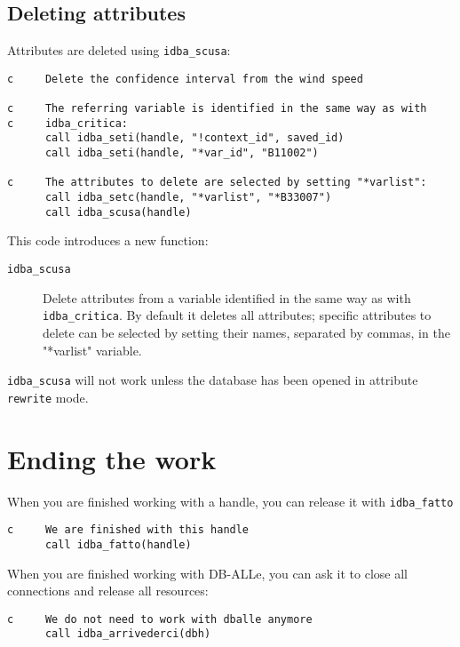 \documentclass[final,12pt,a4paper,twoside]{book}
\begin{document}
\subsection{Deleting attributes}

Attributes are deleted using {\tt idba\_scusa}:

\label{fun-idba_scusa}

\begin{verbatim}
c     Delete the confidence interval from the wind speed

c     The referring variable is identified in the same way as with
c     idba_critica:
      call idba_seti(handle, "!context_id", saved_id)
      call idba_seti(handle, "*var_id", "B11002")

c     The attributes to delete are selected by setting "*varlist":
      call idba_setc(handle, "*varlist", "*B33007")
      call idba_scusa(handle)
\end{verbatim}

This code introduces a new function:

\begin{description}
\item[{\tt idba\_scusa}]
  Delete attributes from a variable identified in the same way as with {\tt
  idba\_critica}.  By default it deletes all attributes; specific attributes to
  delete can be selected by setting their names, separated by commas, in the
  "*varlist" variable.
\end{description}

{\tt idba\_scusa} will not work unless the database has been opened in
attribute {\tt rewrite} mode.


\section{Ending the work}

When you are finished working with a handle, you can release it with {\tt idba\_fatto}

\label{fun-idba_fatto}

\begin{verbatim}
c     We are finished with this handle
      call idba_fatto(handle)
\end{verbatim}

When you are finished working with DB-ALLe, you can ask it to close all
connections and release all resources:

\label{fun-idba_arrivederci}

\begin{verbatim}
c     We do not need to work with dballe anymore
      call idba_arrivederci(dbh)
\end{verbatim}
\end{document}
